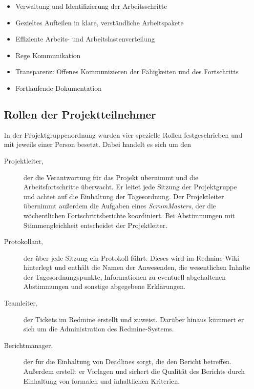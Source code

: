 \begin{itemize}
  \item Verwaltung und Identifizierung der Arbeitsschritte
  \item Gezieltes Aufteilen in klare, verständliche Arbeitspakete
  \item Effiziente Arbeits- und Arbeitslastenverteilung
  \item Rege Kommunikation
  \item Transparenz: Offenes Kommunizieren der Fähigkeiten und des Fortschritts
  \item Fortlaufende Dokumentation
\end{itemize}

\subsection{Rollen der Projektteilnehmer}
\label{sec:orga:projekt:rollen}

In der Projektgruppenordnung wurden vier spezielle Rollen festgeschrieben und mit jeweils einer Person besetzt. Dabei handelt es sich um den

\begin{description}
\item[Projektleiter,] der die Verantwortung für das Projekt übernimmt und die
Arbeitsfortschritte überwacht. Er leitet jede Sitzung der Projektgruppe und
achtet auf die Einhaltung der Tagesordnung. Der Projektleiter übernimmt außerdem
die Aufgaben eines \textit{ScrumMasters}, der die wöchentlichen Fortschrittsberichte
koordiniert. Bei Abstimmungen mit Stimmengleichheit entscheidet der
Projektleiter.

\item[Protokollant,] der über jede Sitzung ein Protokoll führt. Dieses wird im
Redmine-Wiki hinterlegt und enthält die Namen der Anwesenden, die wesentlichen Inhalte der
Tagesordnungspunkte, Informationen zu eventuell abgehaltenen Abstimmungen und
sonstige abgegebene Erklärungen.

\item[Teamleiter,] der Tickets im Redmine erstellt und zuweist. Darüber hinaus
kümmert er sich um die Administration des Redmine-Systems.

\item[Berichtmanager,] der für die Einhaltung von Deadlines sorgt, die den Bericht
betreffen. Außerdem erstellt er Vorlagen und sichert die Qualität des Berichts durch
Einhaltung von formalen und inhaltlichen Kriterien.
\end{description}

